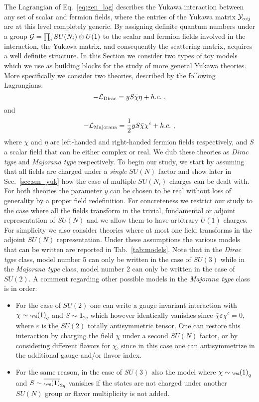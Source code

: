 \documentclass[a4paper,11pt]{article}
\newcommand{\be}{\begin{equation}}
\newcommand{\ee}{\end{equation}}
\begin{document}
The Lagrangian of Eq.~\eqref{eq:gen_lag} describes the Yukawa interaction between any set of scalar and fermion fields, where the entries of the Yukawa matrix ${\cal Y}_{\alpha i j}$ are at this level completely generic. By assigning definite quantum numbers under a group ${\cal G}=\prod_i SU(N_i)\otimes U(1)$ to the scalar and fermion fields involved in the interaction, the Yukawa matrix, and consequently the scattering matrix, acquires a well definite structure. In this Section we consider two types of toy models which we use as building blocks for the study of more general Yukawa theories. More specifically we consider two theories, described by the following Lagrangians:
\be\label{eq:model_I}
-{\cal L}_{\rm Dirac} = y S \bar \chi \eta + h.c.  \ ,
\ee
and
\be\label{eq:model_II}
-{\cal L}_{\rm Majorana} = \frac{1}{2} y S \bar \chi \chi^c + h.c.  \ ,
\ee
where $\chi$ and $\eta$ are left-handed and right-handed fermion fields respectively, and $S$ a scalar field that can be either complex or real. We dub these theories as {\emph{Dirac type}} and {\emph{Majorana type}} respectively.
To begin our study, we start by assuming that all fields are charged under a {\emph{single}} $SU(N)$ factor and show later in Sec.~\ref{sec:sm_yuk} how the case of multiple $SU(N_i)$ charges can be dealt with.  For both theories the parameter $y$ can be chosen to be real without loss of generality by a proper field redefinition. For concreteness we restrict our study to the case where all the fields transform in the trivial, fundamental or adjoint representation of $SU(N)$ and we allow them to have arbitrary $U(1)$ charges. For simplicity we also consider theories where at most one field transforms in the adjoint $SU(N)$ representation. Under these assumptions the various models that can be written are reported in Tab.~\ref{tab:models}. Note that in the {\emph{Dirac type}} class, model number 5 can only be written in the case of $SU(3)$ while in the {\emph{Majorana type}} class, model number 2 can only be written in the case of $SU(2)$. A comment regarding other possible models in the {\emph{Majorana type}} class is in order:
\begin{itemize}
\item For the case of $SU(2)$ one can write a gauge invariant interaction with $\chi \sim {\tiny{\yng(1)}}_q$ and $S \sim \mathbf{1}_{2q}$ which however  identically vanishes since $\bar \chi \varepsilon\chi^c=0$, where $\varepsilon$ is the $SU(2)$ totally antisymmetric tensor. One can restore this interaction by charging the field $\chi$ under a second $SU(N)$ factor, or by considering different flavors for $\chi$, since in this case one can antisymmetrize in the additional gauge and/or flavor index.
%
\item For the same reason, in the case of $SU(3)$ also the model where  $\chi\sim{\tiny{\yng(1)}}_q$ and $S\sim{\tiny{\overline{\yng(1)}}}_{2q}$ vanishes if the states are not charged under another $SU(N)$ group or flavor multiplicity is not added.
\end{itemize}
\end{document}
